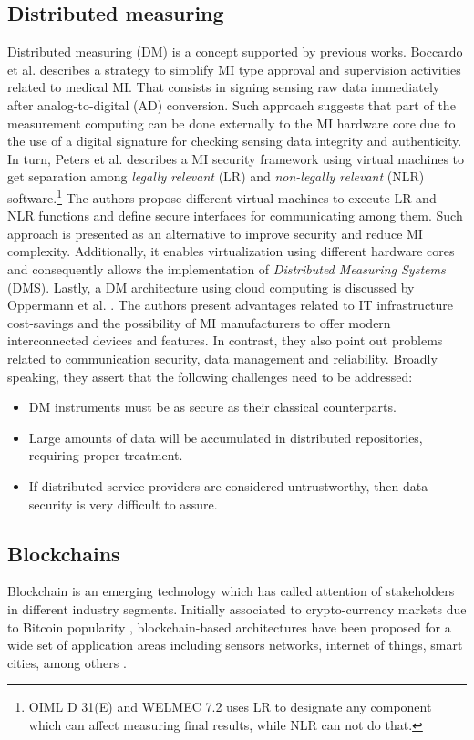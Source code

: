 \documentclass[conference]{IEEEtran}
\begin{document}
\subsection{Distributed measuring}
Distributed measuring (DM) is a concept supported by previous works. Boccardo et al. \cite{Boccardo2014} describes a strategy to simplify MI type approval and supervision activities related to medical MI. That consists in signing sensing raw data immediately after analog-to-digital (AD) conversion. Such approach suggests that part of the measurement computing can be done externally to the MI hardware core due to the use of a digital signature for checking sensing data integrity and authenticity. In turn, Peters et al. \cite{Peters2015} describes a MI security framework using virtual machines to get separation among \emph{legally relevant} (LR) and \emph{non-legally relevant} (NLR) software.\footnote{OIML D 31(E) and WELMEC 7.2 uses LR to designate any component which can affect measuring final results, while NLR can not do that.} The authors propose different virtual machines to execute LR and NLR functions and define secure interfaces for communicating among them. Such approach is presented as an alternative to improve security and reduce MI complexity. Additionally, it enables virtualization using different hardware cores and consequently allows the implementation of \emph{Distributed Measuring Systems} (DMS). Lastly, a DM architecture using cloud computing is discussed by Oppermann et al. \cite{Oppermann2016}. The authors present advantages related to IT infrastructure cost-savings and the possibility of MI manufacturers to offer modern interconnected devices and features. In contrast, they also point out problems related to communication security, data management and reliability. Broadly speaking, they assert that the following challenges need to be addressed:
\begin{itemize}
 \item DM instruments must be as secure as their classical counterparts.
 \item Large amounts of data will be accumulated in distributed repositories, requiring proper treatment.
 \item If distributed service providers are considered untrustworthy, then data security is very difficult to assure. 
\end{itemize}

\subsection{Blockchains}
Blockchain is an emerging technology which has called attention of stakeholders in different industry segments. Initially associated to crypto-currency markets due to Bitcoin popularity \cite{Zheng2017}, blockchain-based architectures have been proposed for a wide set of application areas including sensors networks, internet of things, smart cities, among others \cite{Zheng2017,Christidis2016,Vukolic2017a}. 
\end{document}
